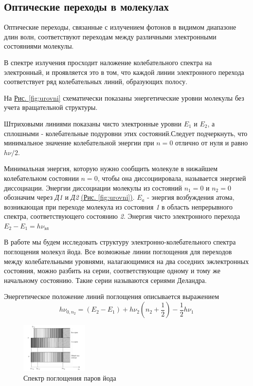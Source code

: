 \documentclass{article}
\begin{document}
\subsection*{Оптические переходы в молекулах}
Оптические переходы, связанные с излучением фотонов в видимом диапазоне длин волн, соответствуют переходам между различными электронными состояниями молекулы. 

В спектре излучения просходит наложение колебательного спектра на электронный, и проявляется это в том, что каждой линии электронного перехода соответствует ряд колебательных линий, образующих полосу.



На \hyperref[fig:urovni]{Рис. \ref*{fig:urovni}} схематически показаны энергетические уровни молекулы без учета вращательной структуры. 

Штриховыми линиями показаны чисто электронные уровни $E_1$ и $E_2$, а сплошными - колебательные подуровни этих состояний.Следует подчеркнуть, что минимальное значение колебательной энергии при $n = 0$ отлично от нуля и равно $h\nu/2$. 

Минимальная энергия, которую нужно сообщить молекуле в нижайшем колебательном состоянии $n = 0$, чтобы она диссоциировала, называется энергией диссоциации. Энергии диссоциации молекулы из состояний $n_1 = 0$ и $n_2 = 0$ обозначим через \textsl{Д1} и \textsl{Д2} \hyperref[fig:urovni]{(Рис. \ref*{fig:urovni})}. $E_a$ - энергия возбуждения атома, возникающая при переходе молекула из состояния \textsl{1} в область непрерывного спектра, соответствующего состоянию \textsl{2}. Энергия чисто электронного перехода $E_2 - E_1 = h\nu_{эл}$

В работе мы будем исследовать структуру электронно-колебательного спектра поглощения молекул йода. Все возможные линии поглощения для переходов между колебательными уровнями, налагающимися на два соседних эжлектронных состояния, можно разбить на серии, соответствующие одному и тому же начальному состоянию. Такие серии называются сериями Деландра. 

Энергетическое положение линий поглощения описывается выражением
\begin{equation}
\label{2 formula}
    h \nu_{0,n_2} = (E_2 - E_1)+ h\nu_2 \left( n_2+\frac{1}{2}\right) -\frac{1}{2}h\nu_1
\end{equation}



\begin{figure}
\begin{center}
\includegraphics[width=0.3\textwidth]{Screenshot 2023-10-07 at 7.42.22 PM.png}
\caption{Спектр поглощения паров йода}
\label{Yod}
\end{center}
\end{figure}
\end{document}
